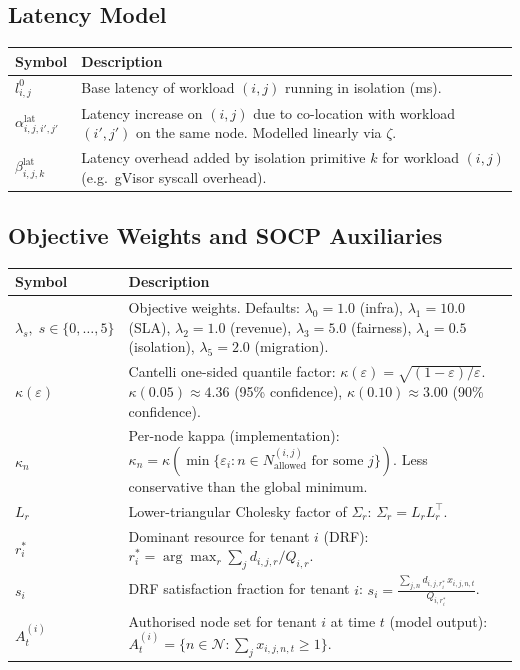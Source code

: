 \documentclass[11pt,a4paper]{article}
\newcommand{\cN}{\mathcal{N}}           %
\newcommand{\kap}{\kappa}               %
\newcommand{\eps}{\varepsilon}          %
\begin{document}
\subsection{Latency Model}

\begin{longtable}{@{}p{3.0cm}p{10.7cm}@{}}
  \toprule
  \textbf{Symbol} & \textbf{Description} \\
  \midrule
  \endhead
  $l^0_{i,j}$                        & Base latency of workload $(i,j)$ running
                                        in isolation (ms). \\[4pt]
  $\alpha_{i,j,i',j'}^{\text{lat}}$  & Latency increase on $(i,j)$ due to
                                        co-location with workload $(i',j')$ on the
                                        same node.  Modelled linearly via $\zeta$. \\[4pt]
  $\beta_{i,j,k}^{\text{lat}}$       & Latency overhead added by isolation primitive
                                        $k$ for workload $(i,j)$ (e.g.\ gVisor syscall
                                        overhead). \\
  \bottomrule
\end{longtable}

\subsection{Objective Weights and SOCP Auxiliaries}

\begin{longtable}{@{}p{2.6cm}p{11.1cm}@{}}
  \toprule
  \textbf{Symbol} & \textbf{Description} \\
  \midrule
  \endhead
  $\lambda_s,\;s\in\{0,\ldots,5\}$
    & Objective weights.  Defaults: $\lambda_0=1.0$ (infra), $\lambda_1=10.0$
      (SLA), $\lambda_2=1.0$ (revenue), $\lambda_3=5.0$ (fairness),
      $\lambda_4=0.5$ (isolation), $\lambda_5=2.0$ (migration). \\[4pt]
  $\kap(\eps)$
    & Cantelli one-sided quantile factor:
      $\kap(\eps)=\sqrt{(1-\eps)/\eps}$.
      $\kap(0.05)\approx 4.36$ (95\% confidence),
      $\kap(0.10)\approx 3.00$ (90\% confidence). \\[4pt]
  $\kap_n$
    & Per-node kappa (implementation):
      $\kap_n = \kap\!\left(\min\{\eps_i : n\in N_{\text{allowed}}^{(i,j)}
      \text{ for some }j\}\right)$.
      Less conservative than the global minimum. \\[4pt]
  $L_r$
    & Lower-triangular Cholesky factor of $\Sigma_r$:
      $\Sigma_r = L_r L_r^\top$. \\[4pt]
  $r^*_i$
    & Dominant resource for tenant $i$ (DRF):
      $r^*_i = \arg\max_r \sum_j d_{i,j,r}/Q_{i,r}$. \\[4pt]
  $s_i$
    & DRF satisfaction fraction for tenant $i$:
      $s_i = \frac{\sum_{j,n} d_{i,j,r^*_i}\,x_{i,j,n,t}}{Q_{i,r^*_i}}$. \\[4pt]
  $A_t^{(i)}$
    & Authorised node set for tenant $i$ at time $t$ (model output):
      $A_t^{(i)} = \{n\in\cN : \sum_j x_{i,j,n,t} \ge 1\}$. \\
  \bottomrule
\end{longtable}
\end{document}
